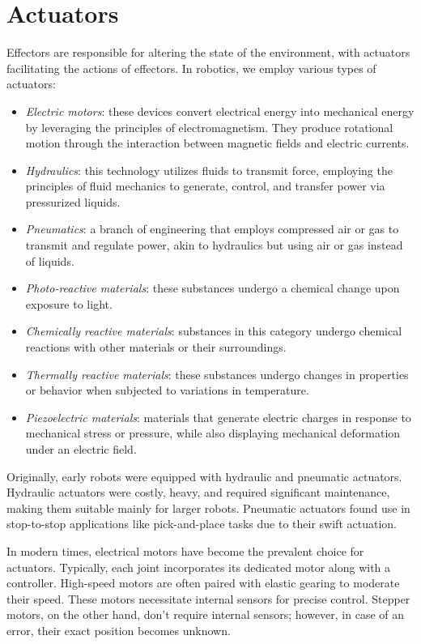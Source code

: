 \section{Actuators}

Effectors are responsible for altering the state of the environment, with actuators facilitating the actions of effectors.
In robotics, we employ various types of actuators:
\begin{itemize}
    \item \textit{Electric motors}: these devices convert electrical energy into mechanical energy by leveraging the principles of electromagnetism. 
        They produce rotational motion through the interaction between magnetic fields and electric currents.
    \item \textit{Hydraulics}: this technology utilizes fluids to transmit force, employing the principles of fluid mechanics to generate, control, and transfer power via pressurized liquids.
    \item \textit{Pneumatics}: a branch of engineering that employs compressed air or gas to transmit and regulate power, akin to hydraulics but using air or gas instead of liquids.
    \item \textit{Photo-reactive materials}: these substances undergo a chemical change upon exposure to light.
    \item \textit{Chemically reactive materials}: substances in this category undergo chemical reactions with other materials or their surroundings.
    \item \textit{Thermally reactive materials}: these substances undergo changes in properties or behavior when subjected to variations in temperature.
    \item \textit{Piezoelectric materials}: materials that generate electric charges in response to mechanical stress or pressure, while also displaying mechanical deformation under an electric field.
\end{itemize}

Originally, early robots were equipped with hydraulic and pneumatic actuators. 
Hydraulic actuators were costly, heavy, and required significant maintenance, making them suitable mainly for larger robots. 
Pneumatic actuators found use in stop-to-stop applications like pick-and-place tasks due to their swift actuation.

In modern times, electrical motors have become the prevalent choice for actuators. 
Typically, each joint incorporates its dedicated motor along with a controller. 
High-speed motors are often paired with elastic gearing to moderate their speed. 
These motors necessitate internal sensors for precise control. 
Stepper motors, on the other hand, don't require internal sensors; however, in case of an error, their exact position becomes unknown.

